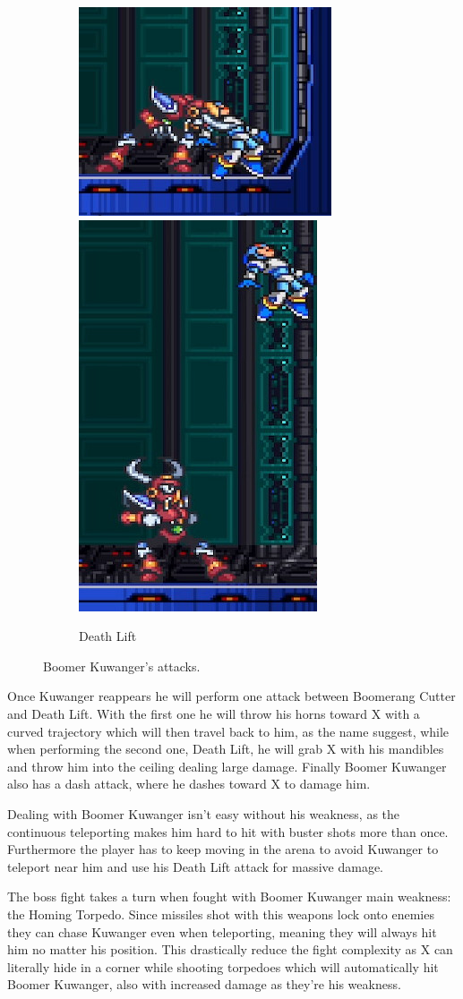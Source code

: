\begin{figure}
	\ContinuedFloat
	\centering
	\begin{subfigure}{\linewidth}
		\centering
		\includegraphics[width=0.4\linewidth]{figures/X1/Boomer_kuwanger/Boomer_lift_1.jpg}
		\includegraphics[width=0.2\linewidth]{figures/X1/Boomer_kuwanger/Boomer_lift_2.jpg}
		\caption{Death Lift}
	\end{subfigure}
	\caption{Boomer Kuwanger's attacks.}
\end{figure}
Once Kuwanger reappears he will perform one attack between Boomerang Cutter and Death Lift. With the first one he will throw his horns toward X with a curved trajectory which will then travel back to him, as the name suggest, while when performing the second one, Death Lift, he will grab X with his mandibles and throw him into the ceiling dealing large damage. Finally Boomer Kuwanger also has a dash attack, where he dashes toward X to damage him.

Dealing with Boomer Kuwanger isn't easy without his weakness, as the continuous teleporting makes him hard to hit with buster shots more than once. Furthermore the player has to keep moving in the arena to avoid Kuwanger to teleport near him and use his Death Lift attack for massive damage.

The boss fight takes a turn when fought with Boomer Kuwanger main weakness: the Homing Torpedo. Since missiles shot with this weapons lock onto enemies they can chase Kuwanger even when teleporting, meaning they will always hit him no matter his position. This drastically reduce the fight complexity as X can literally hide in a corner while shooting torpedoes which will automatically hit Boomer Kuwanger, also with increased damage as they're his weakness.


